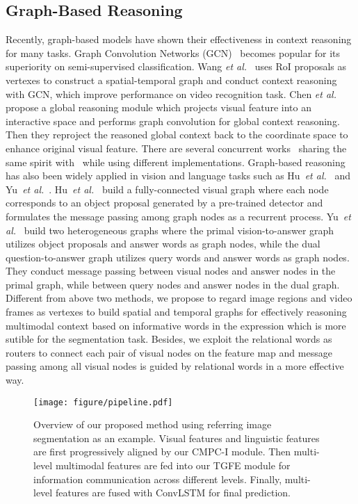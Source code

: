 \documentclass[10pt,journal,cspaper,compsoc]{IEEEtran}
\begin{document}
\subsection{Graph-Based Reasoning}
Recently, graph-based models have shown their effectiveness in context reasoning for many tasks. 
Graph Convolution Networks (GCN)~\cite{chandra2017dense} becomes popular for its superiority on semi-supervised classification. 
Wang \textit{et al.}~\cite{wang2018videos} uses RoI proposals as vertexes to construct a spatial-temporal graph and conduct context reasoning with GCN, which improve performance on video recognition task. 
Chen \textit{et al.}~\cite{chen2019graph} propose 
a global reasoning module which projects visual feature into an interactive space and performs graph convolution for global context reasoning. 
Then they reproject the reasoned global context back to the coordinate space 
to enhance original visual feature. 
There are several concurrent works~\cite{li2018beyond}\cite{liang2018symbolic}\cite{zhang2019latentgnn} sharing the same spirit with~\cite{chen2019graph} while using different implementations. 
Graph-based reasoning has also been widely applied in vision and language tasks such as Hu~\textit{et al.}~\cite{hu2019language} and Yu~\textit{et al.}~\cite{yu2019heterogeneous}. Hu~\textit{et al.}~\cite{hu2019language} build a fully-connected visual graph where each node corresponds to an object proposal generated by a pre-trained detector and formulates the message passing among graph nodes as a recurrent process. Yu~\textit{et al.}~\cite{yu2019heterogeneous} build two heterogeneous graphs where the primal vision-to-answer graph utilizes object proposals and answer words as graph nodes, while the dual question-to-answer graph utilizes query words and answer words as graph nodes. 
They conduct message passing between visual nodes and answer nodes in the primal graph, while between query nodes and answer nodes in the dual graph.
Different from above two methods, we propose to regard image regions and video frames as vertexes to build 
spatial and temporal graphs for effectively reasoning multimodal context based on informative words in the expression which is more sutible for the segmentation task.
Besides, we exploit the relational words as routers to connect each pair of visual nodes on the feature map and message passing among all visual nodes is guided by relational words in a more effective way.

\begin{figure*}[t]
   \begin{center}
      \texttt{[image: figure/pipeline.pdf]}
   \end{center}
      \caption{Overview of our proposed method using referring image segmentation as an example. Visual features and linguistic features are first progressively aligned by 
      our CMPC-I module. Then multi-level multimodal features are fed into our TGFE module for information communication across different levels. Finally, multi-level features are fused with ConvLSTM for final prediction.}
   \label{fig:pipeline}
\end{figure*}
\end{document}
